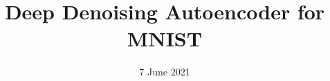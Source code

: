 \documentclass[10pt]{beamer}
\date{7 June 2021}
\title{Deep Denoising Autoencoder for MNIST}
\def\shallowpicture{\tikz\pic{model={/tikz/base model,sep=3pt,color=shallow color,add reversed=true,layers={{c=100,w=24pt},{c=25,w=12pt}}}};}
\def\greedypicture{\tikz\pic{model={/tikz/base model,color=greedy color,add reversed=true,layers={{c=100,w=24pt},{c=75,w=20pt},{c=50,w=16pt},{c=25,w=12pt}}}};}
\def\nopretrainpicture{\tikz\pic{model={/tikz/base model,color=no-pretrain color,add reversed=true,layers={{c=100,w=24pt},{c=75,w=20pt},{c=50,w=16pt},{c=25,w=12pt}}}};}
\def\finetunedpicture{\tikz\pic{model={/tikz/base model,color=fine-tuned color,add reversed=true,layers={{c=100,w=24pt},{c=75,w=20pt},{c=50,w=16pt},{c=25,w=12pt}}}};}
\def\shallowtext{\tabitem $1+1$ layers}
\def\greedytext{\tabitem$8+8$ layers\\\tabitem greedy pretraining}
\def\nopretraintext{\tabitem$8+8$ layers\\\tabitem random initialization\\\phantomtabitem with fine-tuning}
\def\finetunedtext{\tabitem $8+8$ layers\\\tabitem greedy pretraining\\\phantomtabitem with fine-tuning}
\newcommand{\tabitem}{~~\llap{\textbullet}~}
\newcommand{\phantomtabitem}{~~\llap{\phantom{\textbullet}}~}
\begin{document}
\frame{\titlepage}

\begin{comment}
\begin{frame}{Denoising autoencoders}
\begin{columns}
\begin{column}{.35\textwidth}
\begin{itemize}
\item Models trained to reconstruct input without noise.
\item Information bottleneck.
\item ??
\end{itemize}
\end{column}
\begin{column}{.65\textwidth}
\begin{center}
\setlength{\tabcolsep}{2ex}
\def\imageh{1cm}
\begin{tabulary}{\linewidth}{ C @{\hskip 2ex} L C }\toprule
\multicolumn{2}{l}{Ground truth}&\makecell{\tikz\pic{load digit={ir-input.eps}};}\\
\multicolumn{2}{l}{Noisy input}&\makecell{\tikz\pic{load digit={ir-noisy.eps}};}\\\midrule
\makecell{\shallowpicture}&\makecell[l]{\shallowtext}&\makecell{\tikz\pic{load digit={ir-shallow.eps}};}\\
\makecell{\greedypicture}&\makecell[l]{\greedytext}&\makecell{\tikz\pic{load digit={ir-deep_greedy.eps}};}\\
\makecell{\nopretrainpicture}&\makecell[l]{\nopretraintext}&\makecell{\tikz\pic{load digit={ir-deep_no_pretrain.eps}};}\\
\makecell{\finetunedpicture}&\makecell[l]{\finetunedtext}&\makecell{\tikz\pic{load digit={ir-deep_finetuned.eps}};}\\\bottomrule
\end{tabulary}
\end{center}
\end{column}
\end{columns}
\end{frame}

\begin{frame}[fragile]{Model evaluation}


\end{comment}
\end{document}
